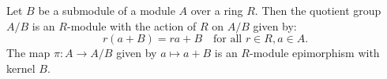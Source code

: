 Let $B$ be a submodule of a module $A$ over a ring $R$. Then the quotient group $A/B$ is an $R$-module with the action of $R$ on $A/B$ given by:
\[
r(a + B) = ra + B \quad \text{for all } r \in R, a \in A.
\]
The map $\pi : A \to A/B$ given by $a \mapsto a + B$ is an $R$-module epimorphism with kernel $B$.

